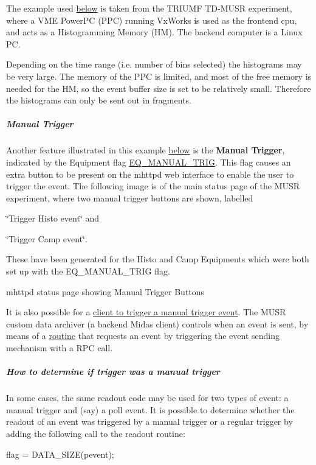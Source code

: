 The example used \hyperlink{FE_eq_event_routines_FE_tdmusr_equipment}{below} is taken from the TRIUMF TD-\/MUSR experiment, where a VME PowerPC (PPC) running VxWorks is used as the frontend cpu, and acts as a Histogramming Memory (HM). The backend computer is a Linux PC.

Depending on the time range (i.e. number of bins selected) the histograms may be very large. The memory of the PPC is limited, and most of the free memory is needed for the HM, so the event buffer size is set to be relatively small. Therefore the histograms can only be sent out in fragments.

\label{FE_eq_event_routines_idx_event_manual-trigger}
\hypertarget{FE_eq_event_routines_idx_event_manual-trigger}{}
 \hypertarget{FE_eq_event_routines_FE_manual_trigger}{}\subparagraph{Manual Trigger}\label{FE_eq_event_routines_FE_manual_trigger}
Another feature illustrated in this example \hyperlink{FE_eq_event_routines_FE_tdmusr_equipment}{below} is the {\bfseries  Manual Trigger}, indicated by the Equipment flag \hyperlink{FE_table_FE_tbl_EqManTrig}{EQ\_\-MANUAL\_\-TRIG}. This flag causes an extra button to be present on the mhttpd web interface to enable the user to trigger the event. The following image is of the main status page of the MUSR experiment, where two manual trigger buttons are shown, labelled
\begin{DoxyItemize}
\item \char`\"{}Trigger Histo event\char`\"{} and
\item \char`\"{}Trigger Camp event\char`\"{}.
\end{DoxyItemize}

These have been generated for the Histo and Camp Equipments which were both set up with the EQ\_\-MANUAL\_\-TRIG flag. \par
 \begin{center} mhttpd status page showing Manual Trigger Buttons  \end{center}  \par


It is also possible for a \hyperlink{FE_eq_event_routines_FE_backend_Manual_Trigger}{client to trigger a manual trigger event}. The MUSR custom data archiver (a backend Midas client) controls when an event is sent, by means of a \hyperlink{FE_eq_event_routines_FE_backend_Manual_Trigger}{routine} that requests an event by triggering the event sending mechanism with a RPC call.\hypertarget{FE_eq_event_routines_FE_manual_trig_determine}{}\subparagraph{How to determine if trigger was a manual trigger}\label{FE_eq_event_routines_FE_manual_trig_determine}
In some cases, the same readout code may be used for two types of event: a manual trigger and (say) a poll event. It is possible to determine whether the readout of an event was triggered by a manual trigger or a regular trigger by adding the following call to the readout routine: 
\begin{DoxyCode}
  flag = DATA_SIZE(pevent);
\end{DoxyCode}


